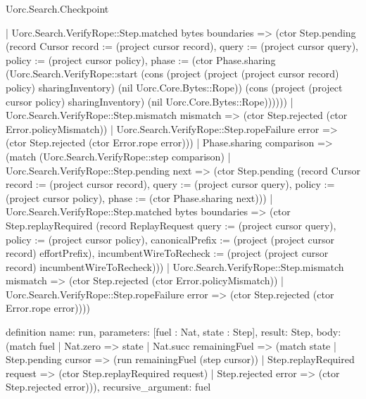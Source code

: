 \begin{lexlean}{Uorc.Search.Checkpoint}
\begin{semanticmodule}
{      | Uorc.Search.VerifyRope::Step.matched bytes boundaries => (ctor Step.pending (record Cursor {record := (project cursor record), query := (project cursor query), policy := (project cursor policy), phase := (ctor Phase.sharing (Uorc.Search.VerifyRope::start (cons (project (project (project cursor record) policy) sharingInventory) (nil Uorc.Core.Bytes::Rope)) (cons (project (project cursor policy) sharingInventory) (nil Uorc.Core.Bytes::Rope))))}))
      | Uorc.Search.VerifyRope::Step.mismatch mismatch => (ctor Step.rejected (ctor Error.policyMismatch))
      | Uorc.Search.VerifyRope::Step.ropeFailure error => (ctor Step.rejected (ctor Error.rope error)))
    | Phase.sharing comparison => (match (Uorc.Search.VerifyRope::step comparison)
      | Uorc.Search.VerifyRope::Step.pending next => (ctor Step.pending (record Cursor {record := (project cursor record), query := (project cursor query), policy := (project cursor policy), phase := (ctor Phase.sharing next)}))
      | Uorc.Search.VerifyRope::Step.matched bytes boundaries => (ctor Step.replayRequired (record ReplayRequest {query := (project cursor query), policy := (project cursor policy), canonicalPrefix := (project (project cursor record) effortPrefix), incumbentWireToRecheck := (project (project cursor record) incumbentWireToRecheck)}))
      | Uorc.Search.VerifyRope::Step.mismatch mismatch => (ctor Step.rejected (ctor Error.policyMismatch))
      | Uorc.Search.VerifyRope::Step.ropeFailure error => (ctor Step.rejected (ctor Error.rope error))))
}

definition{
  name: run,
  parameters: [fuel : Nat, state : Step],
  result: Step,
  body: (match fuel
    | Nat.zero => state
    | Nat.succ remainingFuel => (match state
      | Step.pending cursor => (run remainingFuel (step cursor))
      | Step.replayRequired request => (ctor Step.replayRequired request)
      | Step.rejected error => (ctor Step.rejected error))),
  recursive_argument: fuel
}
\end{semanticmodule}
\end{lexlean}
